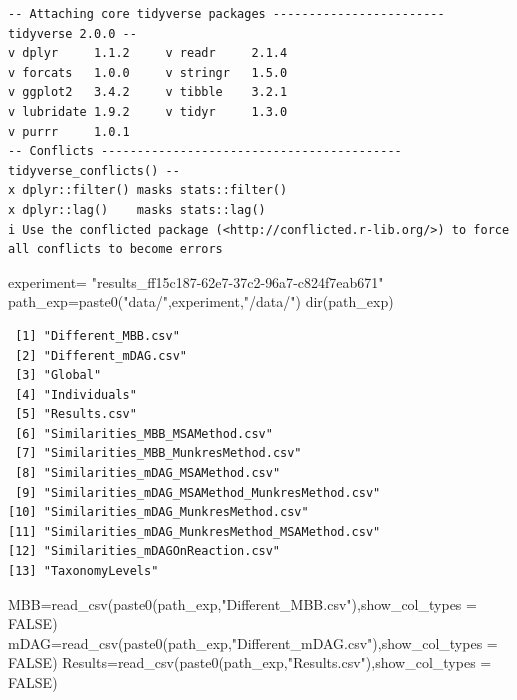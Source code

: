 \documentclass[
  letterpaper,
  DIV=11,
  numbers=noendperiod]{scrreprt}
\newenvironment{Shaded}{\begin{snugshade}}{\end{snugshade}}
\newcommand{\AttributeTok}[1]{\textcolor[rgb]{0.40,0.45,0.13}{#1}}
\newcommand{\ConstantTok}[1]{\textcolor[rgb]{0.56,0.35,0.01}{#1}}
\newcommand{\FunctionTok}[1]{\textcolor[rgb]{0.28,0.35,0.67}{#1}}
\newcommand{\NormalTok}[1]{\textcolor[rgb]{0.00,0.23,0.31}{#1}}
\newcommand{\OtherTok}[1]{\textcolor[rgb]{0.00,0.23,0.31}{#1}}
\newcommand{\StringTok}[1]{\textcolor[rgb]{0.13,0.47,0.30}{#1}}
\begin{document}
\begin{verbatim}
-- Attaching core tidyverse packages ------------------------ tidyverse 2.0.0 --
v dplyr     1.1.2     v readr     2.1.4
v forcats   1.0.0     v stringr   1.5.0
v ggplot2   3.4.2     v tibble    3.2.1
v lubridate 1.9.2     v tidyr     1.3.0
v purrr     1.0.1     
-- Conflicts ------------------------------------------ tidyverse_conflicts() --
x dplyr::filter() masks stats::filter()
x dplyr::lag()    masks stats::lag()
i Use the conflicted package (<http://conflicted.r-lib.org/>) to force all conflicts to become errors
\end{verbatim}

\begin{Shaded}
\begin{Highlighting}[]
\NormalTok{experiment}\OtherTok{=}
  \StringTok{"results\_ff15c187{-}62e7{-}37c2{-}96a7{-}c824f7eab671"}
\NormalTok{path\_exp}\OtherTok{=}\FunctionTok{paste0}\NormalTok{(}\StringTok{"data/"}\NormalTok{,experiment,}\StringTok{"/data/"}\NormalTok{)}
\FunctionTok{dir}\NormalTok{(path\_exp)}
\end{Highlighting}
\end{Shaded}

\begin{verbatim}
 [1] "Different_MBB.csv"                            
 [2] "Different_mDAG.csv"                           
 [3] "Global"                                       
 [4] "Individuals"                                  
 [5] "Results.csv"                                  
 [6] "Similarities_MBB_MSAMethod.csv"               
 [7] "Similarities_MBB_MunkresMethod.csv"           
 [8] "Similarities_mDAG_MSAMethod.csv"              
 [9] "Similarities_mDAG_MSAMethod_MunkresMethod.csv"
[10] "Similarities_mDAG_MunkresMethod.csv"          
[11] "Similarities_mDAG_MunkresMethod_MSAMethod.csv"
[12] "Similarities_mDAGOnReaction.csv"              
[13] "TaxonomyLevels"                               
\end{verbatim}

\begin{Shaded}
\begin{Highlighting}[]
\NormalTok{MBB}\OtherTok{=}\FunctionTok{read\_csv}\NormalTok{(}\FunctionTok{paste0}\NormalTok{(path\_exp,}\StringTok{"Different\_MBB.csv"}\NormalTok{),}\AttributeTok{show\_col\_types =} \ConstantTok{FALSE}\NormalTok{)}
\NormalTok{mDAG}\OtherTok{=}\FunctionTok{read\_csv}\NormalTok{(}\FunctionTok{paste0}\NormalTok{(path\_exp,}\StringTok{"Different\_mDAG.csv"}\NormalTok{),}\AttributeTok{show\_col\_types =} \ConstantTok{FALSE}\NormalTok{)}
\NormalTok{Results}\OtherTok{=}\FunctionTok{read\_csv}\NormalTok{(}\FunctionTok{paste0}\NormalTok{(path\_exp,}\StringTok{"Results.csv"}\NormalTok{),}\AttributeTok{show\_col\_types =} \ConstantTok{FALSE}\NormalTok{)}
\end{Highlighting}
\end{Shaded}
\end{document}
